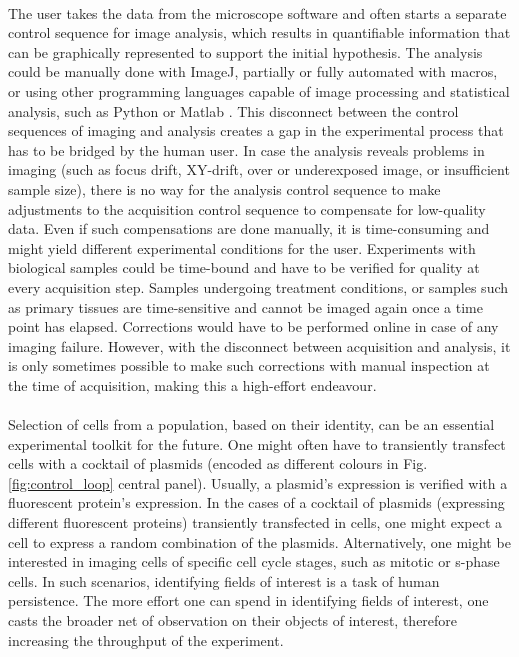 \paragraph*{} The user takes the data from the microscope software and often starts a separate control sequence for image analysis, which results in quantifiable information that can be graphically represented to support the initial hypothesis. The analysis could be manually done with ImageJ, partially or fully automated with macros, or using other programming languages capable of image processing and statistical analysis, such as Python or Matlab \cite{haase2022hitchhiker}. This disconnect between the control sequences of imaging and analysis creates a gap in the experimental process that has to be bridged by the human user. In case the analysis reveals problems in imaging (such as focus drift, XY-drift, over or underexposed image, or insufficient sample size), there is no way for the analysis control sequence to make adjustments to the acquisition control sequence to compensate for low-quality data. Even if such compensations are done manually, it is time-consuming and might yield different experimental conditions for the user. Experiments with biological samples could be time-bound and have to be verified for quality at every acquisition step. Samples undergoing treatment conditions, or samples such as primary tissues are time-sensitive and cannot be imaged again once a time point has elapsed. Corrections would have to be performed online in case of any imaging failure. However, with the disconnect between acquisition and analysis, it is only sometimes possible to make such corrections with manual inspection at the time of acquisition, making this a high-effort endeavour.

\paragraph*{} Selection of cells from a population, based on their identity, can be an essential experimental toolkit for the future. One might often have to transiently transfect cells with a cocktail of plasmids (encoded as different colours in Fig. \ref{fig:control_loop} central panel). Usually, a plasmid's expression is verified with a fluorescent protein's expression. In the cases of a cocktail of plasmids (expressing different fluorescent proteins) transiently transfected in cells, one might expect a cell to express a random combination of the plasmids. Alternatively, one might be interested in imaging cells of specific cell cycle stages, such as mitotic or s-phase cells. In such scenarios, identifying fields of interest is a task of human persistence. The more effort one can spend in identifying fields of interest, one casts the broader net of observation on their objects of interest, therefore increasing the throughput of the experiment.

